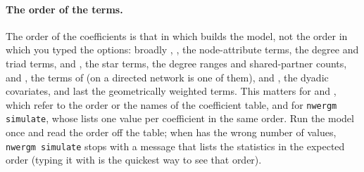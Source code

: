 \paragraph{The order of the terms.} The order of the coefficients is that in which \nwergm{} builds the model, not the order in which you typed the options: broadly , , the node-attribute terms, the degree and triad terms,  and , the star terms, the degree ranges and shared-partner counts,  and , the terms of  (on a directed network  is one of them),  and , the dyadic covariates, and last the geometrically weighted terms. This matters for  and , which refer to the order or the names of the coefficient table, and for \texttt{nwergm simulate}, whose  lists one value per coefficient in the same order. Run the model once and read the order off the table; when  has the wrong number of values, \texttt{nwergm simulate} stops with a message that lists the statistics in the expected order (typing it with  is the quickest way to see that order).
